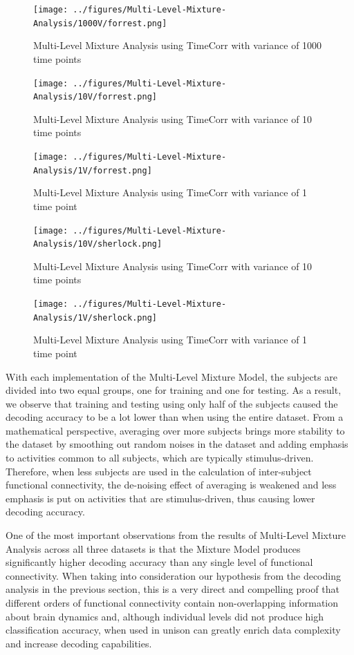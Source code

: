 \documentclass[11pt]{article}
\begin{document}
\begin{figure}[!htb]
\caption{Multi-Level Mixture Analysis using TimeCorr with variance of 1000 time points}
\centering
\texttt{[image: ../figures/Multi-Level-Mixture-Analysis/1000V/forrest.png]}
\label{fig:forrestMM1000}
\end{figure}

\begin{figure}[!htb]
\caption{Multi-Level Mixture Analysis using TimeCorr with variance of 10 time points}
\centering
\texttt{[image: ../figures/Multi-Level-Mixture-Analysis/10V/forrest.png]}
\label{fig:forrestMM10}
\end{figure}

\begin{figure}[!htb]
\caption{Multi-Level Mixture Analysis using TimeCorr with variance of 1 time point}
\centering
\texttt{[image: ../figures/Multi-Level-Mixture-Analysis/1V/forrest.png]}
\label{fig:forrestMM1}
\end{figure}

\begin{figure}[!htb]
\caption{Multi-Level Mixture Analysis using TimeCorr with variance of 10 time points}
\centering
\texttt{[image: ../figures/Multi-Level-Mixture-Analysis/10V/sherlock.png]}
\label{fig:sherlockMM10}
\end{figure}

\begin{figure}[!htb]
\caption{Multi-Level Mixture Analysis using TimeCorr with variance of 1 time point}
\centering
\texttt{[image: ../figures/Multi-Level-Mixture-Analysis/1V/sherlock.png]}
\label{fig:sherlockMM1}
\end{figure}

With each implementation of the Multi-Level Mixture Model, the subjects are divided into two equal groups, one for training and one for testing. As a result, we observe that training and testing using only half of the subjects caused the decoding accuracy to be a lot lower than when using the entire dataset. From a mathematical perspective, averaging over more subjects brings more stability to the dataset by smoothing out random noises in the dataset and adding emphasis to activities common to all subjects, which are typically stimulus-driven. Therefore, when less subjects are used in the calculation of inter-subject functional connectivity, the de-noising effect of averaging is weakened and less emphasis is put on activities that are stimulus-driven, thus causing lower decoding accuracy.

One of the most important observations from the results of Multi-Level Mixture Analysis across all three datasets is that the Mixture Model produces significantly higher decoding accuracy than any single level of functional connectivity. When taking into consideration our hypothesis from the decoding analysis in the previous section, this is a very direct and compelling proof that different orders of functional connectivity contain non-overlapping information about brain dynamics and, although individual levels did not produce high classification accuracy, when used in unison can greatly enrich data complexity and increase decoding capabilities.
\end{document}
